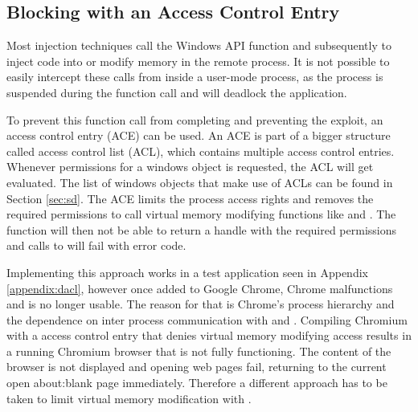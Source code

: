 \subsection{Blocking  with an Access Control Entry}
\label{sec:dacl}
Most injection techniques call the Windows API function  and subsequently  to inject code into or modify memory in the remote process. It is not possible to easily intercept these calls from inside a user-mode process, as the process is suspended during the  function call and will deadlock the application.

\medskip

To prevent this function call from completing and preventing the exploit, an access control entry (ACE) can be used. An ACE is part of a bigger structure called access control list (ACL), which contains multiple access control entries. Whenever permissions for a windows object is requested, the ACL will get evaluated. The list of windows objects that make use of ACLs can be found in Section \ref{sec:sd}. The ACE limits the process access rights and removes the required permissions to call virtual memory modifying functions like  and . The  function will then not be able to return a handle with the required permissions and calls to  will fail with  error code.

\medskip

Implementing this approach works in a test application seen in Appendix \ref{appendix:dacl}, however once added to Google Chrome, Chrome malfunctions and is no longer usable. The reason for that is Chrome's process hierarchy and the dependence on inter process communication with  and . Compiling Chromium with a access control entry that denies virtual memory modifying access results in a running Chromium browser that is not fully functioning. The content of the browser is not displayed and opening web pages fail, returning to the current open about:blank page immediately. Therefore a different approach has to be taken to limit virtual memory modification with .